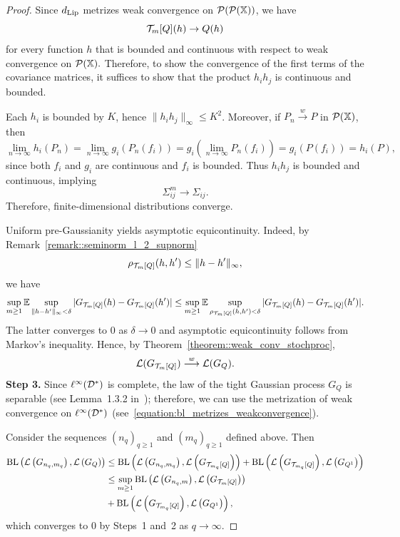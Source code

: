 \begin{proof}
Since $d_{\mathrm{Lip}}$ metrizes weak convergence on $\mathcal{P}(\mathcal{P}(\mathbb{X}))$, we have
\[
\mathcal{T}_m[Q](h) \to Q(h)
\]
for every function $h$ that is bounded and continuous with respect to weak convergence on $\mathcal{P}(\mathbb{X}).$ Therefore, to show the convergence of the first terms of the covariance matrices, it suffices to show that the product $h_ih_j$ is continuous and bounded.

Each $h_i$ is bounded by $K$, hence $\|h_i h_j\|_\infty \le K^2$. Moreover, if $P_n \overset{w}{\to} P$ in $\mathcal{P}(\mathbb{X})$, then
\[
\lim_{n \to \infty} h_i(P_n) 
= \lim_{n \to \infty} g_i(P_n(f_i)) 
= g_i \left(\lim_{n \to \infty} P_n(f_i)  \right) 
= g_i\left(P(f_i)\right) 
= h_i(P),
\]
since both $f_i$ and $g_i$ are continuous and $f_i$ is bounded. Thus $h_i h_j$ is bounded and continuous, implying
\[
\Sigma^m_{ij} \to \Sigma_{ij}.
\]
Therefore, finite-dimensional distributions converge.

Uniform pre-Gaussianity yields asymptotic equicontinuity. Indeed, by Remark~\ref{remark::seminorm_l_2_supnorm}
\[
\rho_{\mathcal{T}_m[Q]}(h,h') \le \|h-h'\|_\infty,
\]
we have
\[
\sup_{m \geq 1}\mathbb{E}\sup_{\|h-h'\|_\infty<\delta}
|G_{\mathcal{T}_m[Q]}(h)-G_{\mathcal{T}_m[Q]}(h')| \leq 
\sup_{m \geq 1}\mathbb{E}\sup_{\rho_{\mathcal{T}_m[Q]}(h,h')<\delta}
|G_{\mathcal{T}_m[Q]}(h)-G_{\mathcal{T}_m[Q]}(h')|.
\]
The latter converges to $0$ as $\delta \to 0$ and asymptotic equicontinuity follows from Markov's inequality. Hence, by Theorem~\ref{theorem::weak_conv_stochproc},
\[
\mathcal{L}(G_{\mathcal{T}_m[Q]}) \overset{w}{\longrightarrow} \mathcal{L}(G_{Q}).
\]
\textbf{Step 3.}
Since $\ell^\infty(\mathcal{D}^*)$ is complete, the law of the tight Gaussian process $G_{Q}$ is separable (see Lemma~1.3.2 in~\cite{van1996weak}); therefore, we can use the metrization of weak convergence on $\ell^\infty(\mathcal{D}^*)$ (see~\eqref{equation:bl_metrizes_weakconvergence}).

Consider the sequences $(n_q)_{q\geq 1}$ and $(m_q)_{q\geq 1}$ defined above. Then
\begin{align*}
\mathrm{BL}\left( \mathcal{L}\left(G_{n_q,m_q}\right), \mathcal{L}\left(G_{Q} \right)\right)
& \leq \mathrm{BL}\left( \mathcal{L}\left(G_{n_q,m_q}\right), \mathcal{L}\left(G_{\mathcal{T}_{m_q}[Q]} \right)\right) 
 + \mathrm{BL}\left( \mathcal{L}\left(G_{\mathcal{T}_{m_q}[Q]}\right), \mathcal{L}\left(G_{Q^{1}} \right)\right) \\
& \leq \sup_{m \geq 1} \mathrm{BL}\left( \mathcal{L}\left(G_{n_q,m}\right), \mathcal{L}\left(G_{\mathcal{T}_m[Q]} \right)\right) \\
& + \mathrm{BL}\left( \mathcal{L}\left(G_{\mathcal{T}_{m_q}[Q]}\right), \mathcal{L}\left(G_{Q^{1}} \right)\right),
\end{align*}
which converges to $0$ by Steps~1 and~2 as $q \to \infty$.


\end{proof}
